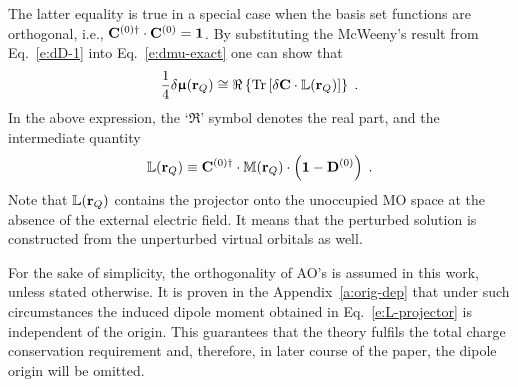 \documentclass[aip,amsmath,amssymb,reprint,floatfix]{revtex4-1}
\newcommand{\BM}[1]{\bm{#1}}
\DeclareMathOperator{\Tr}{Tr}
\begin{document}
%
The latter equality is true in a special case when the basis set functions are orthogonal, i.e., 
${\bf C}^{(0)\dagger} \cdot {\bf C}^{(0)}={\bf 1}$.
By substituting the McWeeny's result from Eq.~\eqref{e:dD-1}
into Eq.~\eqref{e:dmu-exact} one can show that
%
%
\begin{equation}\label{e:dmu-l-vector}
 \frac{1}{4} 
 \delta {\BM{\upmu}}({\bf r}_Q)
  \cong
  \Re \left\{ 
 \Tr{ 
    \left[ 
         \delta {\bf C} \cdot \mathbb{L}({\bf r}_Q)
   \right] }  
  \right\} \;.
\end{equation}
%
In the above expression, the `$\Re$' symbol denotes the real part,
and the intermediate quantity
%
\begin{equation} \label{e:L-projector}
 \mathbb{L}({\bf r}_Q) \equiv {\bf C}^{(0)\dagger} \cdot \mathbb{M}({\bf r}_Q) \cdot \left( {\bf 1} - {\bf D}^{(0)} \right) \;.
\end{equation}
%
Note that $\mathbb{L}({\bf r}_Q)$ contains the projector onto
the unoccupied MO space at the absence of the external electric field. It means that the
perturbed solution is constructed from the unperturbed virtual orbitals as well.

For the sake of simplicity, 
the orthogonality of AO's is assumed in this work, unless stated otherwise.
It is proven in the Appendix~\ref{a:orig-dep} that under such circumstances the
induced dipole moment obtained in Eq.~\eqref{e:L-projector} is independent of the origin. 
This guarantees that the theory fulfils the total charge conservation requirement and,
therefore, in later course of the paper, the dipole origin will be omitted. 
\end{document}
